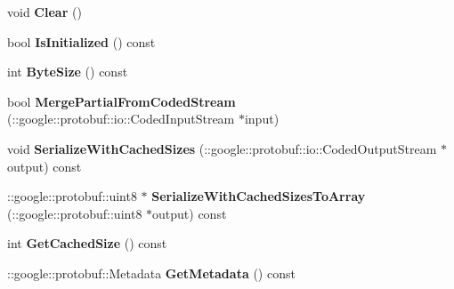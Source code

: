 \begin{DoxyCompactItemize}
\item 
\hypertarget{classSimpleChat_1_1NetworkMessageHeader_a33544fbb349ce8275b334e31d4e708f4}{void {\bfseries Clear} ()}\label{classSimpleChat_1_1NetworkMessageHeader_a33544fbb349ce8275b334e31d4e708f4}

\item 
\hypertarget{classSimpleChat_1_1NetworkMessageHeader_acc0a30d58655083c79af4472f7aee3a2}{bool {\bfseries Is\-Initialized} () const }\label{classSimpleChat_1_1NetworkMessageHeader_acc0a30d58655083c79af4472f7aee3a2}

\item 
\hypertarget{classSimpleChat_1_1NetworkMessageHeader_a3e2312da986374bf537e1c173eb220a1}{int {\bfseries Byte\-Size} () const }\label{classSimpleChat_1_1NetworkMessageHeader_a3e2312da986374bf537e1c173eb220a1}

\item 
\hypertarget{classSimpleChat_1_1NetworkMessageHeader_a2581c3d79e42bd4d3ac450a4437852c4}{bool {\bfseries Merge\-Partial\-From\-Coded\-Stream} (\-::google\-::protobuf\-::io\-::\-Coded\-Input\-Stream $\ast$input)}\label{classSimpleChat_1_1NetworkMessageHeader_a2581c3d79e42bd4d3ac450a4437852c4}

\item 
\hypertarget{classSimpleChat_1_1NetworkMessageHeader_a01d04719c32328fb2bb106e89790fd72}{void {\bfseries Serialize\-With\-Cached\-Sizes} (\-::google\-::protobuf\-::io\-::\-Coded\-Output\-Stream $\ast$output) const }\label{classSimpleChat_1_1NetworkMessageHeader_a01d04719c32328fb2bb106e89790fd72}

\item 
\hypertarget{classSimpleChat_1_1NetworkMessageHeader_a23591751df56360a33c07b61206bde95}{\-::google\-::protobuf\-::uint8 $\ast$ {\bfseries Serialize\-With\-Cached\-Sizes\-To\-Array} (\-::google\-::protobuf\-::uint8 $\ast$output) const }\label{classSimpleChat_1_1NetworkMessageHeader_a23591751df56360a33c07b61206bde95}

\item 
\hypertarget{classSimpleChat_1_1NetworkMessageHeader_aa031119fe9b93440b129d9dea6f42c3d}{int {\bfseries Get\-Cached\-Size} () const }\label{classSimpleChat_1_1NetworkMessageHeader_aa031119fe9b93440b129d9dea6f42c3d}

\item 
\hypertarget{classSimpleChat_1_1NetworkMessageHeader_ad784a116c57d281e27fb07daaf1bb37e}{\-::google\-::protobuf\-::\-Metadata {\bfseries Get\-Metadata} () const }\label{classSimpleChat_1_1NetworkMessageHeader_ad784a116c57d281e27fb07daaf1bb37e}


\end{DoxyCompactItemize}
